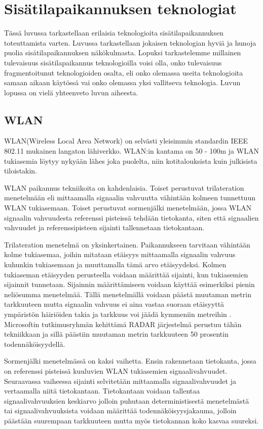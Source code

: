 \section{Sisätilapaikannuksen teknologiat}
Tässä luvussa tarkastellaan erilaisia teknologioita sisätilapaikannuksen toteuttamista varten. Luvussa tarkastellaan jokaisen teknologian hyviä ja hunoja puolia sisätilapaikannuksen näkökulmasta. Lopuksi tarkastelemme millainen tulevaisuus sisätilapaikannus teknologioilla voisi olla, onko tulevaisuus fragmentoitunut teknologioiden osalta, eli onko olemassa useita teknologioita samaan aikaan käytössä vai onko olemassa yksi vallitseva teknologia. Luvun lopussa on vielä yhteenveto luvun aiheesta.
\subsection{WLAN}
WLAN(Wireless Local Area Network) on selvästi yleisimmin standardin IEEE 802.11 mukainen langaton lähiverkko\cite{A}. WLAN:in kantama on 50 - 100m ja WLAN tukiasemia löytyy nykyään lähes joka puolelta, niin kotitalouksista kuin julkisista tiloistakin.

WLAN paikannus tekniikoita on kahdenlaisia. Toiset perustuvat trilateration menetelmään eli mittaamalla signaalin vahvuutta vähintään kolmeen tunnettuun WLAN tukiasemaan. Toiset perustuvat sormenjälki menetelmään, jossa WLAN signaalin vahvuudesta referenssi pisteissä tehdään tietokanta, siten että signaalien vahvuudet ja referenssipisteen sijainti tallennetaan tietokantaan.\cite{G}
 
Trilateration menetelmä on yksinkertainen. Paikannukseen tarvitaan vähintään kolme tukiasemaa, joihin mitataan etäisyys mittaamalla signaalin vahvuus kuhunkin tukiasemaan ja muuttamalla tämä arvo etäisyydeksi. Kolmen tukiaseman etäisyyden perusteella voidaan määrittää sijainti, kun tukiasemien sijainnit tunnetaan. Sijainnin määrittämiseen voidaan käyttää esimerkiksi pienin neliösumma menetelmää.\cite{G} Tällä menetelmällä voidaan päästä muutaman metrin tarkkuuteen\cite{G} mutta signaalin vahvuus ei aina vastaa suoraan etäisyyttä ympäristön häiriöiden takia ja tarkkuus voi jäädä kymmeniin metreihin \cite{A}. Microsoftin tutkimusryhmän kehittämä RADAR\cite{H} järjestelmä perustuu tähän tekniikkaan ja sillä päästiin muutaman metrin tarkkuuteen 50 prosentin todennäköisyydellä.

Sormenjälki menetelmässä on kaksi vaihetta\cite{G}. Ensin rakennetaan tietokanta, jossa on referenssi pisteissä kuuluvien WLAN tukiasemien signaalivahvuudet. Seuraavassa vaiheessa sijainti selvitetään mittaamalla signaalivahvuudet ja vertaamalla niitä tietokantaan. Tietokantaan voidaan tallentaa signaalivahvuuksien keskiarvo jolloin puhutaan deterministisestä menetelmästä tai signaalivahvuuksista voidaan määrittää todennäköisyysjakauma, jolloin päästään suurempaan tarkkuuteen mutta myös tietokannan koko kasvaa suureksi.\cite{G}

